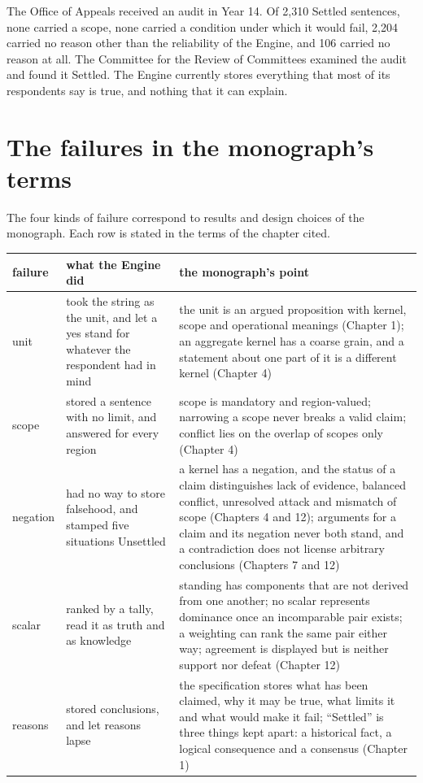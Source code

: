 \documentclass[11pt]{article}
\begin{document}
The Office of Appeals received an audit in Year 14. Of 2{,}310 Settled sentences, none carried a scope, none carried a condition under which it would fail, 2{,}204 carried no reason other than the reliability of the Engine, and 106 carried no reason at all. The Committee for the Review of Committees examined the audit and found it Settled. The Engine currently stores everything that most of its respondents say is true, and nothing that it can explain.

\section{The failures in the monograph's terms}\label{sec:terms}

The four kinds of failure correspond to results and design choices of the monograph. Each row is stated in the terms of the chapter cited.

\begin{center}
\small
\begin{tabularx}{\textwidth}{@{}l X X@{}}
\toprule
failure & what the Engine did & the monograph's point\\
\midrule
unit & took the string as the unit, and let a yes stand for whatever the respondent had in mind & the unit is an argued proposition with kernel, scope and operational meanings (Chapter 1); an aggregate kernel has a coarse grain, and a statement about one part of it is a different kernel (Chapter 4)\\
scope & stored a sentence with no limit, and answered for every region & scope is mandatory and region-valued; narrowing a scope never breaks a valid claim; conflict lies on the overlap of scopes only (Chapter 4)\\
negation & had no way to store falsehood, and stamped five situations Unsettled & a kernel has a negation, and the status of a claim distinguishes lack of evidence, balanced conflict, unresolved attack and mismatch of scope (Chapters 4 and 12); arguments for a claim and its negation never both stand, and a contradiction does not license arbitrary conclusions (Chapters 7 and 12)\\
scalar & ranked by a tally, read it as truth and as knowledge & standing has components that are not derived from one another; no scalar represents dominance once an incomparable pair exists; a weighting can rank the same pair either way; agreement is displayed but is neither support nor defeat (Chapter 12)\\
reasons & stored conclusions, and let reasons lapse & the specification stores what has been claimed, why it may be true, what limits it and what would make it fail; ``Settled'' is three things kept apart: a historical fact, a logical consequence and a consensus (Chapter 1)\\
\bottomrule
\end{tabularx}
\end{center}
\end{document}
